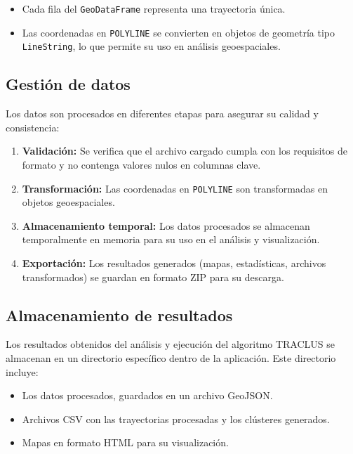 \begin{itemize}
    \item Cada fila del \texttt{GeoDataFrame} representa una trayectoria única.
    \item Las coordenadas en \texttt{POLYLINE} se convierten en objetos de geometría tipo \texttt{LineString}, lo que permite su uso en análisis geoespaciales.
\end{itemize}

\subsection{Gestión de datos}

Los datos son procesados en diferentes etapas para asegurar su calidad y consistencia:

\begin{enumerate}
    \item \textbf{Validación:} Se verifica que el archivo cargado cumpla con los requisitos de formato y no contenga valores nulos en columnas clave.
    \item \textbf{Transformación:} Las coordenadas en \texttt{POLYLINE} son transformadas en objetos geoespaciales.
    \item \textbf{Almacenamiento temporal:} Los datos procesados se almacenan temporalmente en memoria para su uso en el análisis y visualización.
    \item \textbf{Exportación:} Los resultados generados (mapas, estadísticas, archivos transformados) se guardan en formato ZIP para su descarga.
\end{enumerate}

\subsection{Almacenamiento de resultados}

Los resultados obtenidos del análisis y ejecución del algoritmo TRACLUS se almacenan en un directorio específico dentro de la aplicación. Este directorio incluye:

\begin{itemize}
    \item Los datos procesados, guardados en un archivo GeoJSON.
    \item Archivos CSV con las trayectorias procesadas y los clústeres generados.
    \item Mapas en formato HTML para su visualización.
\end{itemize}

